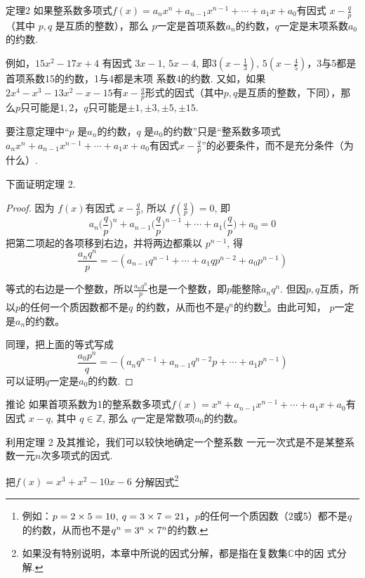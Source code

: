 \begin{thm}
    {定理2} 如果整系数多项式$f(x)=a_nx^n+a_{n-1}x^{n-1}+\cdots+a_{1}x+a_{0}$有因式 $x-\frac qp$（其中 $p,q$ 是互质的整数），那么 $p$一定是首项系数$a_n$的约数，$q$一定是末项系数$a_0$的约数.
\end{thm}

例如，$15x^2-17x+4$ 有因式 $3x-1$, $5x-4$, 即$3\left(x-\frac{1}{3}\right)$, $5\left(x-\frac{4}{5}\right)$，3与5都是首项系数15的约数，1与4都是末项
系数4的约数. 又如，如果$2x^4-x^3-13x^2-x-15$有$x-\frac qp$形式的因式（其中$p,q$是互质的整数，下同），那么$p$只可能是$1,2$，$q$只可能是$\pm1,\pm3,\pm5,\pm15$.

要注意定理中“$p$ 是$a_n$的约数，$q$ 是$a_0$的约数”只是“整系数多项式$a_nx^n+a_{n-1}x^{n-1}+\cdots+a_1x+a_0$有因式$x-\frac qp$”的必要条件，而不是充分条件（为什么）.

下面证明定理 2.

\begin{proof}
因为 $f(x)$有因式 $x-\frac qp$, 所以 $f\left(\frac qp\right)=0$, 即
$$a_{n}\Big(\frac{q}{p}\Big)^{n}+a_{n-1}\Big(\frac{q}{p}\Big)^{n-1}+\cdots+a_{1}\Big(\frac{q}{p}\Big)+a_{0}=0$$
把第二项起的各项移到右边，并将两边都乘以 $p^{n-1}$, 得
$$\frac{a_nq^n}p=-(a_{n-1}q^{n-1}+\cdots+a_1qp^{n-2}+a_0p^{n-1})$$

等式的右边是一个整数，所以$\frac{a_nq^n}p$也是一个整数，即$p$能整除$a_nq^n$. 但因$p,q$互质，所以$p$的任何一个质因数都不是$q$ 的约数，从而也不是$q^{n}$的约数\footnote{例如：$p=2\times 5=10$, $q=3\times 7=21$，$p$的任何一个质因数（2或5）都不是$q$的约数，从而也不是$q^n=3^n\times 7^n$的约数.}。由此可知，
$p$一定是$a_n$的约数。

同理，把上面的等式写成
$$\frac{a_{0}p^{n}}{q}=-\left(a_{n}q^{n-1}+a_{n-1}q^{n-2}p+\cdots+a_{1}p^{n-1}\right)$$
可以证明$q$一定是$a_0$的约数.
\end{proof}

\begin{thm}
    {推论} 如果首项系数为1的整系数多项式$f(x)=x^{n}+ a_{n-1}x^{n-1}+\cdots+a_1x+a_0$有因式 $x-q$, 其中 $q\in\mathbb{Z}$, 那么 $q$一定是常数项$a_0$的约数。
\end{thm}

利用定理 2 及其推论，我们可以较快地确定一个整系数
一元一次式是不是某整系数一元$n$次多项式的因式.

\begin{example}
    把$f(x)=x^3+x^2-10x-6$ 分解因式\footnote{如果没有特别说明，本章中所说的因式分解，都是指在复数集$\mathbb{C}$中的因
    式分解.}
\end{example}

